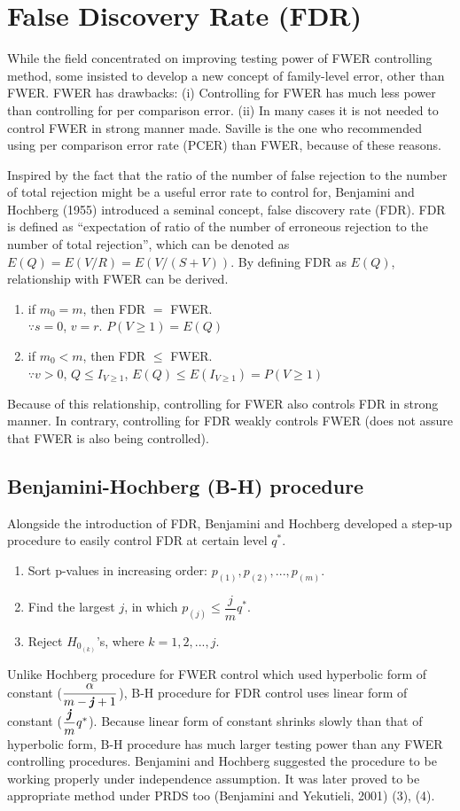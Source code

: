 \documentclass[a4paper, 11pt, oneside]{article}
\begin{document}
\section{False Discovery Rate (FDR)}
While the field concentrated on improving testing power of FWER controlling method, some insisted to develop a new concept of family-level error, other than FWER. FWER has drawbacks: (i) Controlling for FWER has much less power than controlling for per comparison error. (ii) In many cases it is not needed to control FWER in strong manner made. Saville is the one who recommended using per comparison error rate (PCER) than FWER, because of these reasons. \par
    Inspired by the fact that the ratio of the number of false rejection to the number of total rejection might be a useful error rate to control for, Benjamini and Hochberg (1955) introduced a seminal concept, false discovery rate (FDR). FDR is defined as \enquote{expectation of ratio of the number of erroneous rejection to the number of total rejection}, which can be denoted as $E(Q)=E(V/R)=E(V/(S+V))$. By defining FDR as $E(Q)$, relationship with FWER can be derived.
    \begin{enumerate}
    \item if $m_0=m$, then FDR $=$ FWER. \\
      $\because s=0$, $v=r$. $P(V \geq 1)= E(Q)$
    \item if $m_0<m$, then FDR $\leq$ FWER. \\
      $\because v>0$, $Q \leq I_{V \geq 1}$, $E(Q) \leq E(I_{V \geq 1}) = P(V \geq 1)$
    \end{enumerate}
Because of this relationship, controlling for FWER also controls FDR in strong manner. In contrary, controlling for FDR weakly controls FWER (does not assure that FWER is also being controlled).

\subsection{Benjamini-Hochberg (B-H) procedure}
Alongside the introduction of FDR, Benjamini and Hochberg developed a step-up procedure to easily control FDR at certain level $q^*$.
\begin{enumerate}
  \item Sort p-values in increasing order: $p_{(1)}, p_{(2)}, ..., p_{(m)}$.
  \item Find the largest $j$, in which $p_{(j)} \leq \dfrac{j}{m}q^*$.
  \item Reject $H_{0_{(k)}}$'s, where $k=1, 2, ..., j$.
\end{enumerate}
Unlike Hochberg procedure for FWER control which used hyperbolic form of constant ($\dfrac{\alpha}{m-\textbf{\textit{j}}+1}$), B-H procedure for FDR control uses linear form of constant ($\dfrac{\textbf{\textit{j}}}{m}q^*$). Because linear form of constant shrinks slowly than that of hyperbolic form, B-H procedure has much larger testing power than any FWER controlling procedures. Benjamini and Hochberg suggested the procedure to be working properly under independence assumption. It was later proved to be appropriate method under PRDS too (Benjamini and Yekutieli, 2001) (3), (4).
\end{document}
